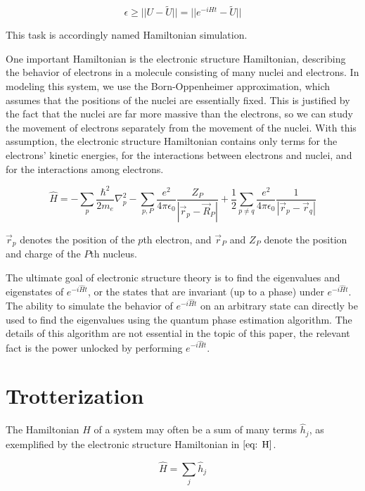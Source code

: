 \begin{equation}
    \epsilon \geq ||U - \tilde{U}|| = ||e^{-iHt} - \tilde{U}||
\end{equation}

This task is accordingly named Hamiltonian simulation.

One important Hamiltonian is the electronic structure Hamiltonian, describing the behavior of electrons in a molecule consisting of many nuclei and electrons. In modeling this system, we use the Born-Oppenheimer approximation, which assumes that the positions of the nuclei are essentially fixed. This is justified by the fact that the nuclei are far more massive than the electrons, so we can study the movement of electrons separately from the movement of the nuclei. With this assumption, the electronic structure Hamiltonian contains only terms for the electrons' kinetic energies, for the interactions between electrons and nuclei, and for the interactions among electrons.

\begin{equation}
    \hat{H} = -\sum_p \frac{\hbar^2}{2m_e} \nabla^2_p - \sum_{p, P}\frac{e^2}{4\pi\epsilon_0}\frac{Z_P}{|\vec{r}_p - \vec{R}_P|} + \frac{1}{2}\sum_{p \neq q}\frac{e^2}{4\pi\epsilon_0}\frac{1}{|\vec{r}_p - \vec{r}_q|} \label{eq: H}
\end{equation}

$\vec{r}_p$ denotes the position of the $p$th electron, and $\vec{r}_P$ and $Z_P$ denote the position and charge of the $P$th nucleus.

The ultimate goal of electronic structure theory is to find the eigenvalues and eigenstates of $e^{-i\hat{H}t}$, or the states that are invariant (up to a phase) under $e^{-i\hat{H}t}$. The ability to simulate the behavior of $e^{-i\hat{H}t}$ on an arbitrary state can directly be used to find the eigenvalues using the quantum phase estimation algorithm. The details of this algorithm are not essential in the topic of this paper, the relevant fact is the power unlocked by performing $e^{-i\hat{H}t}$.

\section{Trotterization}

The Hamiltonian $H$ of a system may often be a sum of many terms $\hat{h}_j$, as exemplified by the electronic structure Hamiltonian in $\eqref{eq: H}$.

\begin{equation}
    \hat{H} = \sum_j \hat{h}_j
\end{equation}

